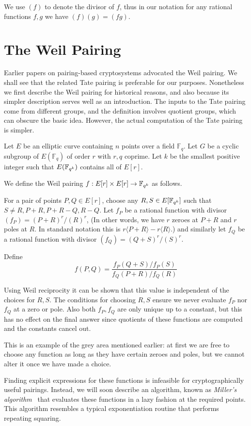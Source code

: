 We use
$(f)$ to denote the divisor of $f$, thus in our notation
for any rational functions $f, g$ we have $(f)(g) = (f g)$.

\section {The Weil Pairing}

Earlier papers on pairing-based cryptosystems advocated the Weil pairing.
We shall see that the related Tate pairing is preferable for our purposes.
Nonetheless we first describe the Weil pairing
for historical reasons, and also because its simpler description
serves well as an introduction. The inputs to the Tate pairing come
from different groups, and the definition involves quotient groups,
which can obscure the basic idea. However, the actual computation
of the Tate pairing is simpler.

Let $E$ be an elliptic curve containing $n$ points over a field $\mathbb{F}_q$.
Let $G$ be a cyclic subgroup of $E(\mathbb{F}_q)$ of order $r$ with $r, q$
coprime. Let $k$ be the smallest positive integer such that $E(\mathbb{F}_{q^k})$
contains all of $E[r]$.

We define the Weil pairing
$f:E[r] \times E[r] \rightarrow \mathbb{F}_{q^k}$ as follows.

For a pair of points $P, Q \in E[r]$,
choose any $R, S \in E[\mathbb{F}_{q^k}]$ such that $S \ne R, P+R, P+R - Q, R-Q$.
Let $f_P$ be a rational function with divisor $(f_P) = (P+R)^r /(R)^r$,
(In other words, we have $r$ zeroes at $P+R$ and $r$ poles at $R$.
In standard notation this is $r\langle P+R\rangle  - r\langle R\rangle$.)
and similarly let $f_Q$ be a rational function with divisor
$(f_Q) = (Q+S)^r/(S)^r$.

Define
\[ f(P,Q) = \frac{f_P(Q+S)/f_P(S)}{f_Q(P+R)/f_Q(R)} \]

Using Weil reciprocity it can be shown that this value is independent
of the choices for $R, S$. The conditions for choosing $R, S$ ensure
we never evaluate $f_P$ nor $f_Q$ at a zero or pole.
Also both $f_P, f_Q$ are only unique up to a constant,
but this has no effect on the final answer since quotients
of these functions are computed and the constants cancel out.

This is an example of the grey area mentioned earlier:
at first we are free to choose
any function as long as they have certain zeroes and poles, but we cannot
alter it once we have made a choice.

Finding explicit expressions for these functions is infeasible for
cryptographically useful pairings. Instead, we will soon describe
an algorithm, known as \emph{Miller's algorithm}~\cite{miller}
that evaluates these functions in a lazy fashion at the required
points. This algorithm resembles a typical exponentiation routine
that performs repeating squaring.

